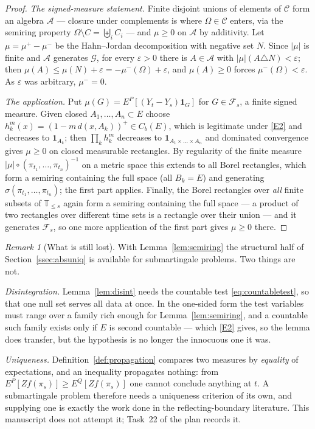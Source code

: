 \documentclass[11pt,a4paper]{article}
\theoremstyle{plain}
\theoremstyle{definition}
\theoremstyle{remark}
\newtheorem{remark}[theorem]{Remark}
\newcommand{\T}{\mathbb{T}}                     %
\newcommand{\Cb}{C_b}                          %
\newcommand{\Filt}{\mathcal{F}}
\newcommand{\Gilt}{\mathcal{G}}
\newcommand{\one}{\mathbf{1}}
\begin{document}
\begin{proof}
  \emph{The signed-measure statement.}  Finite disjoint unions of elements of
  $\mathcal{C}$ form an algebra $\mathcal{A}$ --- closure under complements is
  where $\Omega \in \mathcal{C}$ enters, via the semiring property
  $\Omega \setminus C = \biguplus_i C_i$ --- and $\mu \geq 0$ on $\mathcal{A}$
  by additivity.  Let $\mu = \mu^+ - \mu^-$ be the Hahn--Jordan decomposition with
  negative set $N$.  Since $|\mu|$ is finite and $\mathcal{A}$ generates $\Gilt$,
  for every $\varepsilon > 0$ there is $A \in \mathcal{A}$ with
  $|\mu|(A \triangle N) < \varepsilon$; then
  $\mu(A) \leq \mu(N) + \varepsilon = -\mu^-(\Omega) + \varepsilon$, and $\mu(A) \geq 0$ forces
  $\mu^-(\Omega) < \varepsilon$.  As $\varepsilon$ was arbitrary, $\mu^- = 0$.

  \emph{The application.}  Put $\mu(G) = E^P[(Y_t - Y_s)\one_G]$ for
  $G \in \Filt_s$, a finite signed measure.  Given closed $A_1,\dots,A_n \subset E$
  choose $h^m_k(x) = (1 - m\,d(x,A_k))^+ \in \Cb(E)$, which is legitimate under
  \eqref{E2} and decreases to $\one_{A_k}$; then $\prod_k h^m_k$ decreases to
  $\one_{A_1 \times \dots \times A_n}$ and dominated convergence gives
  $\mu \geq 0$ on closed measurable rectangles.  By regularity of the finite
  measure $|\mu| \circ (\pi_{t_1},\dots,\pi_{t_n})^{-1}$ on a metric space this
  extends to all Borel rectangles, which form a semiring containing the full
  space (all $B_k = E$) and generating
  $\sigma(\pi_{t_1},\dots,\pi_{t_n})$; the first part applies.  Finally, the
  Borel rectangles over \emph{all} finite subsets of $\T_{\leq s}$ again form a
  semiring containing the full space --- a product of two rectangles over
  different time sets is a rectangle over their union --- and it generates
  $\Filt_s$, so one more application of the first part gives $\mu \geq 0$
  there.
\end{proof}

\begin{remark}[What is still lost]
  \label{rem:submartlost}
  With Lemma~\ref{lem:semiring} the structural half of
  Section~\ref{ssec:absuniq} is available for submartingale problems.  Two things
  are not.

  \emph{Disintegration.}  Lemma~\ref{lem:disint} needs the countable test
  \eqref{eq:countabletest}, so that one null set serves all data at once.  In the
  one-sided form the test variables must range over a family rich enough for
  Lemma~\ref{lem:semiring}, and a countable such family exists only if $E$ is
  second countable --- which \eqref{E2} gives, so the lemma does transfer, but the
  hypothesis is no longer the innocuous one it was.

  \emph{Uniqueness.}  Definition~\ref{def:propagation} compares two measures by
  \emph{equality} of expectations, and an inequality propagates nothing: from
  $E^P[Zf(\pi_s)] \geq E^Q[Zf(\pi_s)]$ one cannot conclude anything at $t$.  A
  submartingale problem therefore needs a uniqueness criterion of its own, and
  supplying one is exactly the work done in the reflecting-boundary literature.
  This manuscript does not attempt it; Task~22 of the plan records it.
\end{remark}
\end{document}
